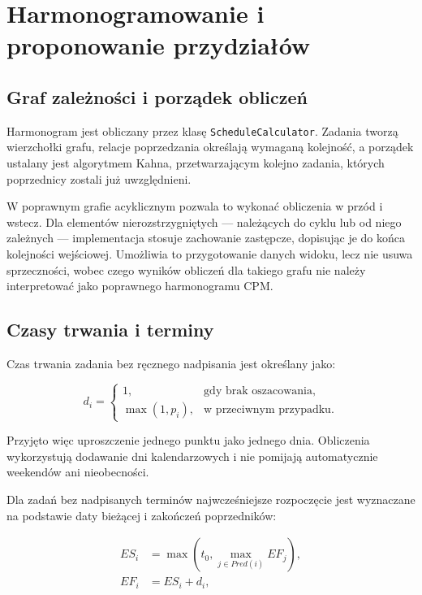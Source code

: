 \section{Harmonogramowanie i proponowanie przydziałów}

\subsection{Graf zależności i porządek obliczeń}

Harmonogram jest obliczany przez klasę \texttt{ScheduleCalculator}. Zadania tworzą wierzchołki grafu, relacje poprzedzania określają wymaganą kolejność, a porządek ustalany jest algorytmem Kahna, przetwarzającym kolejno zadania, których poprzednicy zostali już uwzględnieni.

W poprawnym grafie acyklicznym pozwala to wykonać obliczenia w przód i wstecz. Dla elementów nierozstrzygniętych — należących do cyklu lub od niego zależnych — implementacja stosuje zachowanie zastępcze, dopisując je do końca kolejności wejściowej. Umożliwia to przygotowanie danych widoku, lecz nie usuwa sprzeczności, wobec czego wyników obliczeń dla takiego grafu nie należy interpretować jako poprawnego harmonogramu CPM.

\subsection{Czasy trwania i terminy}

Czas trwania zadania bez ręcznego nadpisania jest określany jako:

\begin{equation}
    d_i =
    \begin{cases}
        1, & \text{gdy brak oszacowania},\\
        \max(1,p_i), & \text{w przeciwnym przypadku}.
    \end{cases}
    \label{eq:harmonogram-czas}
\end{equation}

Przyjęto więc uproszczenie jednego punktu jako jednego dnia. Obliczenia wykorzystują dodawanie dni kalendarzowych i nie pomijają automatycznie weekendów ani nieobecności.

Dla zadań bez nadpisanych terminów najwcześniejsze rozpoczęcie jest wyznaczane na podstawie daty bieżącej i zakończeń poprzedników:

\begin{align}
    ES_i &= \max\left(t_0,\max_{j\in Pred(i)}EF_j\right),\\
    EF_i &= ES_i+d_i,
    \label{eq:harmonogram-przod}
\end{align}

